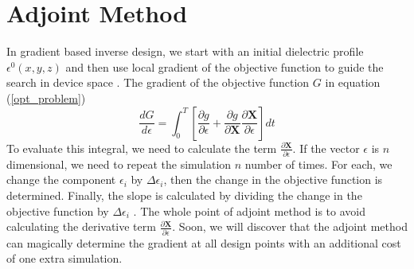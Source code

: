 \documentclass{tufte-handout}
\begin{document}
 \section{Adjoint Method}
 In gradient based inverse design, we start with an initial dielectric profile $\epsilon^{0}(x,y,z)$  and then use local  gradient of the objective function to guide the search in device space . The gradient of the objective function $G$ in equation (\ref{opt_problem})
 \begin{equation}
 \frac{d G}{d\epsilon} = \int_{0}^{T} \left[  \frac{\partial g}{\partial \epsilon} +  \frac{\partial g}{\partial \mathbf{X}} \frac{\partial \mathbf{X}}{\partial \epsilon}\right] dt
 \end{equation}
 To evaluate this integral, we need to calculate the term $ \frac{\partial \mathbf{X}}{\partial \epsilon}$. If the vector $\epsilon$ is $n$ dimensional, we need to repeat the simulation $n$ number of times. For each, we change the component $\epsilon_i$ by $\Delta \epsilon_i$, then the change in the objective function is determined. Finally, the slope is calculated by dividing the change in the objective function by $\Delta \epsilon_i$ . The whole point of adjoint method is to avoid calculating the derivative term $ \frac{\partial \mathbf{X}}{\partial \epsilon}$. Soon, we will discover that the adjoint method can magically determine the gradient at all design points with an additional cost of one extra simulation.  
\end{document}
